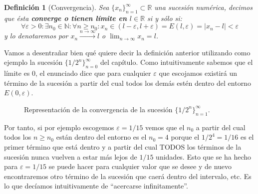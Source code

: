 \documentclass[10pt,a4paper,openright]{book}
\theoremstyle{break}
\newtheorem{defi}{Definición}[chapter]
\begin{document}
\begin{defi}[Convergencia]
Sea $\{x_n\}_{n=1}^{\infty}\subset \mathbb R$ una sucesión numérica, decimos que ésta \textbf{converge o tienen límite en $l\in \mathbb R$} si y sólo si:
$$\forall \varepsilon>0: \exists n_0\in \mathbb N : \forall n\geq n_0: x_n\in (l-\varepsilon, l+\varepsilon)= E(l,\varepsilon)=|x_n-l|<\varepsilon$$
y lo denotaremos por $x_n \xrightarrow{n\rightarrow \infty}l$ o $\lim_{n\rightarrow\infty}x_n = l$.
\end{defi}

Vamos a desentrañar bien qué quiere decir la definición anterior utilizando como ejemplo la sucesión $\{1/2^n\}_{n=0}^\infty$ del capítulo. Como intuitivamente sabemos que el límite es $0$, el enunciado dice que para cualquier $\varepsilon$ que escojamos existirá un término de la sucesión a partir del cual todos los demás estén dentro del entorno $E(0,\varepsilon)$. 

\begin{figure}[h]
\centering
{}
\caption{Representación de la convergencia de la sucesión $\{1/2^n\}_{n=1}^\infty$.}
\label{fig:convergencia}
\end{figure}

Por tanto, si por ejemplo escogemos $\varepsilon = 1/15$ vemos que el $n_0$ a partir del cual todos los $n\geq n_0$ están dentro del entorno es el $n_0=4$ porque el $1/2^4 = 1/16$ es el primer término que está dentro y a partir del cual TODOS los términos de la sucesión nunca vuelven a estar más lejos de $1/15$ unidades. Esto que se ha hecho para $\varepsilon= 1/15$ se puede hacer para cualquier valor que se desee y de nuevo encontraremos otro término de la sucesión que caerá dentro del intervalo, etc. Es lo que decíamos intuitivamente de ``acercarse infinitamente''.
\end{document}
